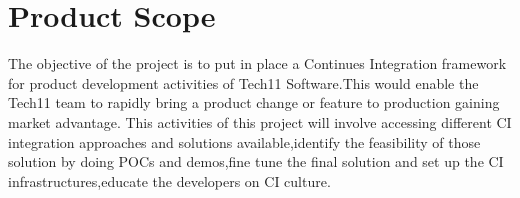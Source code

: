 \documentclass[12pt,a4paper,oneside]{report}
\begin{document}
\section{Product Scope}
The objective of the project is to put in place a Continues Integration framework for
product development activities of Tech11 Software.This would enable the Tech11 team to
rapidly bring a product change or feature to production gaining market advantage. This activities
of this project will involve accessing different CI integration approaches and solutions
available,identify the feasibility of those solution by doing POCs and demos,fine tune the final
solution and set up the CI infrastructures,educate the developers on CI culture.

\end{document}
